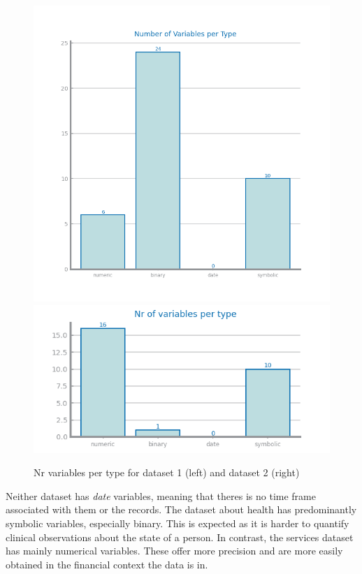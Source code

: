 \documentclass[10pt]{extarticle}
\begin{document}
\begin{figure}[H]
  \includegraphics[scale=0.70]{images/dataset1/data_profiling/CovidPos_variable_types.png}
  \centering\includegraphics[scale=0.7]{images/dataset2/data_profiling/Credit_Score_variable_types.png}
\caption{Nr variables per type for dataset 1 (left) and dataset 2 (right)}
\end{figure}
Neither dataset has \textit{date} variables, meaning that theres is no time frame associated with them or the records.
The dataset about health has predominantly symbolic variables, especially binary. This is expected as it is harder 
to quantify clinical observations about the state of a person. In contrast, the services dataset has mainly numerical variables.
These offer more precision and are more easily obtained in the financial context the data is in.
\end{document}
